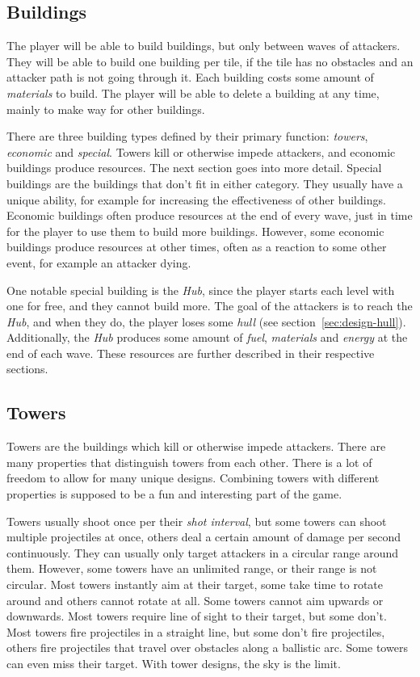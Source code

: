 \subsection{Buildings}

The player will be able to build buildings, but only between waves of attackers.
They will be able to build one building per tile, if the tile has no obstacles and an attacker path is not going through it.
Each building costs some amount of \emph{materials} to build.
The player will be able to delete a building at any time, mainly to make way for other buildings.

There are three building types defined by their primary function: \emph{towers}, \emph{economic} and \emph{special}.
Towers kill or otherwise impede attackers, and economic buildings produce resources.
The next section goes into more detail.
Special buildings are the buildings that don't fit in either category.
They usually have a unique ability, for example for increasing the effectiveness of other buildings.
Economic buildings often produce resources at the end of every wave, just in time for the player to use them to build more buildings.
However, some economic buildings produce resources at other times, often as a reaction to some other event, for example an attacker dying.

One notable special building is the \emph{Hub}, since the player starts each level with one for free, and they cannot build more.
The goal of the attackers is to reach the \emph{Hub}, and when they do, the player loses some \emph{hull} (see section~\ref{sec:design-hull}).
Additionally, the \emph{Hub} produces some amount of \emph{fuel}, \emph{materials} and \emph{energy} at the end of each wave.
These resources are further described in their respective sections.

\subsection{Towers}

Towers are the buildings which kill or otherwise impede attackers.
There are many properties that distinguish towers from each other.
There is a lot of freedom to allow for many unique designs.
Combining towers with different properties is supposed to be a fun and interesting part of the game.

Towers usually shoot once per their \emph{shot interval}, but some towers can shoot multiple projectiles at once, others deal a certain amount of damage per second continuously.
They can usually only target attackers in a circular range around them.
However, some towers have an unlimited range, or their range is not circular.
Most towers instantly aim at their target, some take time to rotate around and others cannot rotate at all.
Some towers cannot aim upwards or downwards.
Most towers require line of sight to their target, but some don't.
Most towers fire projectiles in a straight line, but some don't fire projectiles, others fire projectiles that travel over obstacles along a ballistic arc.
Some towers can even miss their target.
With tower designs, the sky is the limit.

